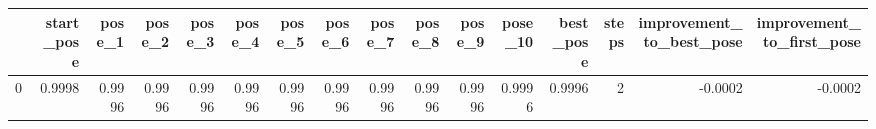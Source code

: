 \begin{tabular}{lrrrrrrrrrrrrrrr}
\toprule
{} &  start\_pose &  pose\_1 &  pose\_2 &  pose\_3 &  pose\_4 &  pose\_5 &  pose\_6 &  pose\_7 &  pose\_8 &  pose\_9 &  pose\_10 &  best\_pose &  steps &  improvement\_to\_best\_pose &  improvement\_to\_first\_pose \\
\midrule
0 &      0.9998 &  0.9996 &  0.9996 &  0.9996 &  0.9996 &  0.9996 &  0.9996 &  0.9996 &  0.9996 &  0.9996 &   0.9996 &     0.9996 &      2 &                   -0.0002 &                    -0.0002 \\
\bottomrule
\end{tabular}
